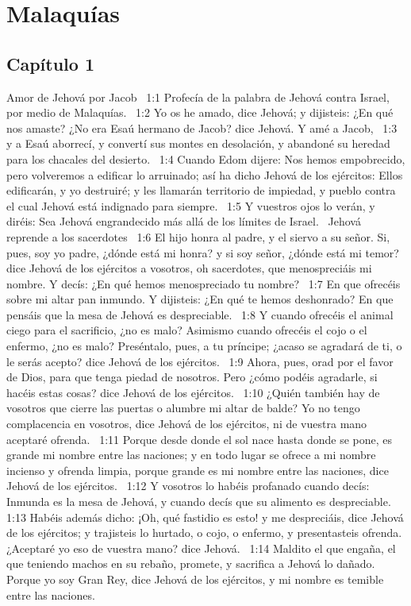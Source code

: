 \chapter{Malaquías}
\section*{Capítulo 1 }
Amor de Jehová por Jacob  
1:1 Profecía de la palabra de Jehová contra Israel, por medio de Malaquías.  
1:2 Yo os he amado, dice Jehová; y dijisteis: ¿En qué nos amaste? ¿No era Esaú hermano de Jacob? dice Jehová. Y amé a Jacob,  
1:3 y a Esaú aborrecí, y convertí sus montes en desolación, y abandoné su heredad para los chacales del desierto.  
1:4 Cuando Edom dijere: Nos hemos empobrecido, pero volveremos a edificar lo arruinado; así ha dicho Jehová de los ejércitos: Ellos edificarán, y yo destruiré; y les llamarán territorio de impiedad, y pueblo contra el cual Jehová está indignado para siempre.  
1:5 Y vuestros ojos lo verán, y diréis: Sea Jehová engrandecido más allá de los límites de Israel.  
Jehová reprende a los sacerdotes  
1:6 El hijo honra al padre, y el siervo a su señor. Si, pues, soy yo padre, ¿dónde está mi honra? y si soy señor, ¿dónde está mi temor? dice Jehová de los ejércitos a vosotros, oh sacerdotes, que menospreciáis mi nombre. Y decís: ¿En qué hemos menospreciado tu nombre?  
1:7 En que ofrecéis sobre mi altar pan inmundo. Y dijisteis: ¿En qué te hemos deshonrado? En que pensáis que la mesa de Jehová es despreciable.  
1:8 Y cuando ofrecéis el animal ciego para el sacrificio, ¿no es malo? Asimismo cuando ofrecéis el cojo o el enfermo, ¿no es malo? Preséntalo, pues, a tu príncipe; ¿acaso se agradará de ti, o le serás acepto? dice Jehová de los ejércitos.  
1:9 Ahora, pues, orad por el favor de Dios, para que tenga piedad de nosotros. Pero ¿cómo podéis agradarle, si hacéis estas cosas? dice Jehová de los ejércitos.  
1:10 ¿Quién también hay de vosotros que cierre las puertas o alumbre mi altar de balde? Yo no tengo complacencia en vosotros, dice Jehová de los ejércitos, ni de vuestra mano aceptaré ofrenda.  
1:11 Porque desde donde el sol nace hasta donde se pone, es grande mi nombre entre las naciones; y en todo lugar se ofrece a mi nombre incienso y ofrenda limpia, porque grande es mi nombre entre las naciones, dice Jehová de los ejércitos.  
1:12 Y vosotros lo habéis profanado cuando decís: Inmunda es la mesa de Jehová, y cuando decís que su alimento es despreciable.  
1:13 Habéis además dicho: ¡Oh, qué fastidio es esto! y me despreciáis, dice Jehová de los ejércitos; y trajisteis lo hurtado, o cojo, o enfermo, y presentasteis ofrenda. ¿Aceptaré yo eso de vuestra mano? dice Jehová.  
1:14 Maldito el que engaña, el que teniendo machos en su rebaño, promete, y sacrifica a Jehová lo dañado. Porque yo soy Gran Rey, dice Jehová de los ejércitos, y mi nombre es temible entre las naciones.  
